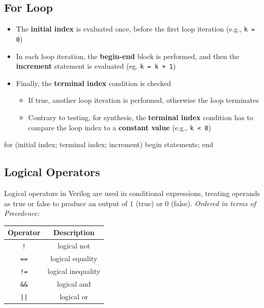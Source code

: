 \documentclass[12pt,openany]{book}
\begin{document}
\subsection{For Loop}

\noindent
\hspace*{-30px}
\begin{minipage}[htp]{0.6\textwidth}
\begin{itemize}
    \item[] The \textbf{initial index} is evaluated once, before the first loop iteration (e.g., \texttt{k = 0})
    \item[] In each loop iteration, the \textbf{begin-end} block is performed, and then the \textbf{increment} statement is evaluated (eg. \texttt{k = k + 1})
    \item[] Finally, the \textbf{terminal index} condition is checked
    \begin{itemize}
        \item If true, another loop iteration is performed, otherwise the loop terminates
        \item Contrary to testing, for synthesis, the \textbf{terminal index} condition has to compare the loop index to a \textbf{constant value} (e.g., \texttt{k < 8})
    \end{itemize}
\end{itemize}
\end{minipage}
\hfill
\begin{minipage}[htp]{0.40\textwidth}
\begin{vhdl}
for (initial index; terminal index; increment)
begin
	statements;
end
\end{vhdl}
\end{minipage}

\subsection{Logical Operators}
Logical operators in Verilog are used in conditional expressions, treating operands as true or false to produce an output of 1 (true) or 0 (false).
\textit{Ordered in terms of Precedence:}
\begin{center}
    \begin{table}[h!]
        \centering
        \begin{tabular}{c|c}
            \hline
            \textbf{Operator} & \textbf{Description} \\
            \hline
            \texttt{!} & logical not \\
            \texttt{==} & logical equality \\
            \texttt{!=} & logical inequality \\
            \texttt{\&\&} & logical and \\
            \texttt{||} & logical or \\
            \hline
        \end{tabular}
    \end{table}
\end{center}
\end{document}
